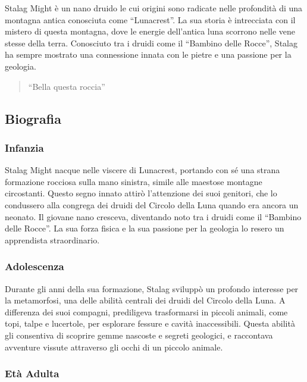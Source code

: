 Stalag Might è un nano druido le cui origini sono radicate nelle
profondità di una montagna antica conosciuta come ``Lunacrest''. La sua
storia è intrecciata con il mistero di questa montagna, dove le energie
dell'antica luna scorrono nelle vene stesse della terra. Conosciuto tra
i druidi come il ``Bambino delle Rocce'', Stalag ha sempre mostrato una
connessione innata con le pietre e una passione per la geologia.

\begin{quote}
``Bella questa roccia''
\end{quote}

\subsection{Biografia}\label{biografia}


\subsubsection{Infanzia}\label{infanzia}


Stalag Might nacque nelle viscere di Lunacrest, portando con sé una
strana formazione rocciosa sulla mano sinistra, simile alle maestose
montagne circostanti. Questo segno innato attirò l'attenzione dei suoi
genitori, che lo condussero alla congrega dei druidi del Circolo della
Luna quando era ancora un neonato. Il giovane nano cresceva, diventando
noto tra i druidi come il ``Bambino delle Rocce''. La sua forza fisica e
la sua passione per la geologia lo resero un apprendista straordinario.

\subsubsection{Adolescenza}\label{adolescenza}


Durante gli anni della sua formazione, Stalag sviluppò un profondo
interesse per la metamorfosi, una delle abilità centrali dei druidi del
Circolo della Luna. A differenza dei suoi compagni, prediligeva
trasformarsi in piccoli animali, come topi, talpe e lucertole, per
esplorare fessure e cavità inaccessibili. Questa abilità gli consentiva
di scoprire gemme nascoste e segreti geologici, e raccontava avventure
vissute attraverso gli occhi di un piccolo animale.

\subsubsection{Età Adulta}\label{etuxe0-adulta}


